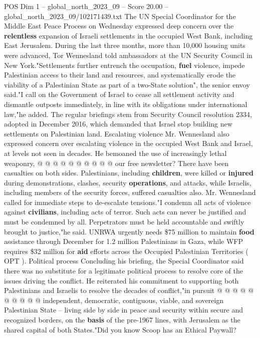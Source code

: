\begin{textsample}{POS Dim 1 – global\_north\_2023\_09 – Score 20.00 – global\_north\_2023\_09/102171439.txt}  \label{ex:f1_pos_352}
The UN Special Coordinator for the Middle East Peace Process on Wednesday expressed deep concern over the \textbf{relentless} expansion of Israeli settlements in the occupied West Bank, including East Jerusalem.
During the last three months, more than 10,000 housing units were advanced, Tor Wennesland told ambassadors at the UN Security Council in New York."Settlements further entrench the occupation, \textbf{fuel} violence, impede Palestinian access to their land and resources, and systematically erode the viability of a Palestinian State as part of a two-State solution", the senior envoy said."I call on the Government of Israel to cease all settlement activity and dismantle outposts immediately, in line with its obligations under international law,"he added.
The regular briefings stem from Security Council resolution 2334, adopted in December 2016, which demanded that Israel stop building new settlements on Palestinian land.
Escalating violence Mr.
Wennesland also expressed concern over escalating violence in the occupied West Bank and Israel, at levels not seen in decades.
He bemoaned the use of increasingly lethal weaponry, @ @ @ @ @ @ @ @ @ @ our free newsletter?
There have been casualties on both sides.
Palestinians, including \textbf{children}, were killed or \textbf{injured} during demonstrations, clashes, security \textbf{operations}, and attacks, while Israelis, including members of the security forces, suffered casualties also.
Mr.
Wennesland called for immediate steps to de-escalate tensions."I condemn all acts of violence against \textbf{civilians}, including acts of terror.
Such acts can never be justified and must be condemned by all.
Perpetrators must be held accountable and swiftly brought to justice,"he said.
UNRWA urgently needs \$75 million to maintain \textbf{food} assistance through December for 1.2 million Palestinians in Gaza, while WFP requires \$32 million for \textbf{aid} efforts across the Occupied Palestinian Territories ( OPT ).
Political process Concluding his briefing, the Special Coordinator said there was no substitute for a legitimate political process to resolve core of the issues driving the conflict.
He reiterated his commitment to supporting both Palestinians and Israelis to resolve the decades of conflict,"in pursuit @ @ @ @ @ @ @ @ @ @ independent, democratic, contiguous, viable, and sovereign Palestinian State -- living side by side in peace and security within secure and recognized borders, on the \textbf{basis} of the pre-1967 lines, with Jerusalem as the shared capital of both States."Did you know Scoop has an Ethical Paywall?

\end{textsample}
